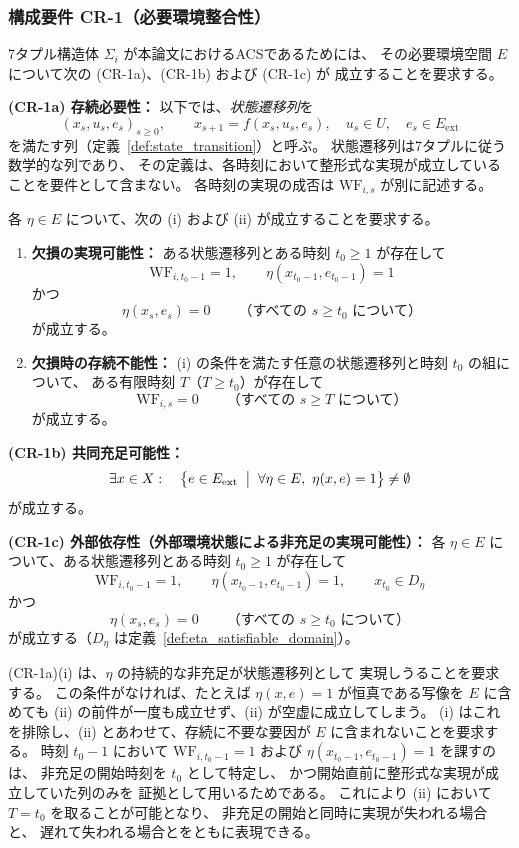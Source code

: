 \subsubsection*{構成要件 CR-1（必要環境整合性）}
\label{req:CR1}

7タプル構造体 $\Sigma_i$ が本論文におけるACSであるためには、
その必要環境空間 $E$ について次の (CR-1a)、(CR-1b) および (CR-1c) が
成立することを要求する。

\medskip
\noindent\textbf{(CR-1a) 存続必要性：}
以下では、\emph{状態遷移列}を
\[
  (x_s,u_s,e_s)_{s\geq0},
  \qquad
  x_{s+1}=f(x_s,u_s,e_s),
  \quad
  u_s\in U,
  \quad
  e_s\in E_{\mathrm{ext}}
\]
を満たす列（定義~\ref{def:state_transition}）と呼ぶ。
状態遷移列は7タプルに従う数学的な列であり、
その定義は、各時刻において整形式な実現が成立していることを要件として含まない。
各時刻の実現の成否は $\mathrm{WF}_{i,s}$ が別に記述する。

各 $\eta\in E$ について、次の (i) および (ii) が成立することを要求する。

\begin{enumerate}
  \item[(i)] \textbf{欠損の実現可能性：}
  ある状態遷移列とある時刻 $t_0\geq1$ が存在して
  \[
    \mathrm{WF}_{i,t_0-1}=1,
    \qquad
    \eta(x_{t_0-1},e_{t_0-1})=1
  \]
  かつ
  \[
    \eta(x_s,e_s)=0
    \qquad
    \text{（すべての } s\geq t_0 \text{ について）}
  \]
  が成立する。

  \item[(ii)] \textbf{欠損時の存続不能性：}
  (i) の条件を満たす任意の状態遷移列と時刻 $t_0$ の組について、
  ある有限時刻 $T$（$T\geq t_0$）が存在して
  \[
    \mathrm{WF}_{i,s}=0
    \qquad
    \text{（すべての } s\geq T \text{ について）}
  \]
  が成立する。
\end{enumerate}

\medskip
\noindent\textbf{(CR-1b) 共同充足可能性：}
\[
  \exists x\in X:\quad
  \bigl\{
    e\in E_{\mathrm{ext}}
    \;\bigm|\;
    \forall \eta\in E,\ \eta(x,e)=1
  \bigr\}
  \neq\emptyset
\]
が成立する。

\medskip
\noindent\textbf{(CR-1c) 外部依存性（外部環境状態による非充足の実現可能性）：}
各 $\eta\in E$ について、ある状態遷移列とある時刻 $t_0\geq1$ が存在して
\[
  \mathrm{WF}_{i,t_0-1}=1,
  \qquad
  \eta(x_{t_0-1},e_{t_0-1})=1,
  \qquad
  x_{t_0}\in D_\eta
\]
かつ
\[
  \eta(x_s,e_s)=0
  \qquad
  \text{（すべての } s\geq t_0 \text{ について）}
\]
が成立する（$D_\eta$ は定義~\ref{def:eta_satisfiable_domain}）。

\medskip
(CR-1a)(i) は、$\eta$ の持続的な非充足が状態遷移列として
実現しうることを要求する。
この条件がなければ、たとえば
$\eta(x,e)=1$ が恒真である写像を $E$ に含めても
(ii) の前件が一度も成立せず、(ii) が空虚に成立してしまう。
(i) はこれを排除し、(ii) とあわせて、存続に不要な要因が $E$ に含まれないことを要求する。
時刻 $t_0-1$ において
$\mathrm{WF}_{i,t_0-1}=1$ および
$\eta(x_{t_0-1},e_{t_0-1})=1$ を課すのは、
非充足の開始時刻を $t_0$ として特定し、
かつ開始直前に整形式な実現が成立していた列のみを
証拠として用いるためである。
これにより (ii) において $T=t_0$ を取ることが可能となり、
非充足の開始と同時に実現が失われる場合と、
遅れて失われる場合とをともに表現できる。

